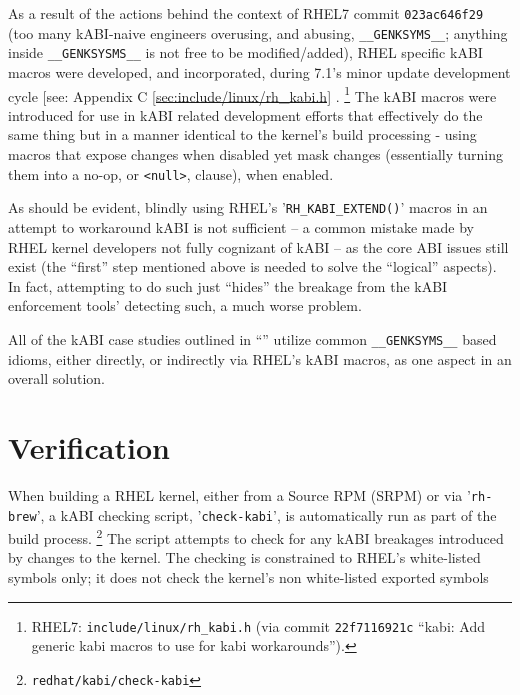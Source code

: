 \documentclass[10pt,oneside,english]{book}
\begin{document}
As a result of the actions behind the context of RHEL7 commit \texttt{023ac646f29}
(too many kABI-naive engineers overusing, and abusing, \texttt{\_\_GENKSYMS\_\_};
anything inside \texttt{\_\_GENKSYSMS\_\_} is not free to be modified/added),
RHEL specific kABI macros were developed, and incorporated, during
7.1's minor update development cycle {[}see: Appendix C \ref{sec:include/linux/rh_kabi.h}
\nameref{sec:include/linux/rh_kabi.h}{]}. \footnote{\label{fn:c3f10}RHEL7: \texttt{include/linux/rh\_kabi.h} (via commit
\texttt{22f7116921c} “kabi: Add generic kabi macros to use for kabi
workarounds”).} The kABI macros were introduced for use in kABI related development
efforts that effectively do the same thing but in a manner identical
to the kernel's build processing - using macros that expose changes
when disabled yet mask changes (essentially turning them into a no-op,
or \texttt{<null>}, clause), when enabled.


As should be evident, blindly using RHEL's '\texttt{RH\_KABI\_EXTEND()}'
macros in an attempt to workaround kABI is not sufficient -- a common
mistake made by RHEL kernel developers not fully cognizant of kABI
-- as the core ABI issues still exist (the ``first'' step mentioned
above is needed to solve the ``logical'' aspects). In fact, attempting
to do such just ``hides'' the breakage from the kABI enforcement
tools' detecting such, a much worse problem.

All of the kABI case studies outlined in ``''
utilize common \texttt{\_\_GENKSYMS\_\_} based idioms, either directly,
or indirectly via RHEL's kABI macros, as one aspect in an overall
solution.

\section{Verification}

When building a RHEL kernel, either from a Source RPM (SRPM) or via
'\texttt{rh-brew}', a kABI checking script, '\texttt{check-kabi}',
is automatically run as part of the build process. \footnote{\texttt{redhat/kabi/check-kabi}}
The script attempts to check for any kABI breakages introduced by
changes to the kernel. The checking is constrained to RHEL's white-listed
symbols only; it does not check the kernel's non white-listed exported
symbols
\end{document}
